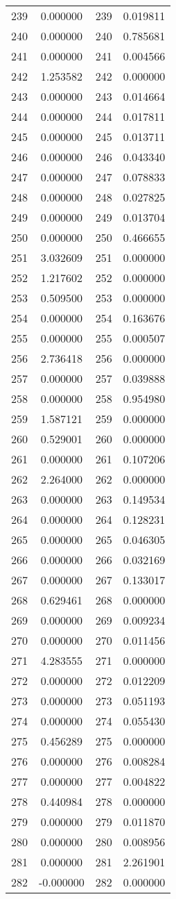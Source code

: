\documentclass[12pt]{article}
\begin{document}
\begin{longtable}{@{}cccc@{}}
239 & 0.000000 & 239 & 0.019811 \\
240 & 0.000000 & 240 & 0.785681 \\
241 & 0.000000 & 241 & 0.004566 \\
242 & 1.253582 & 242 & 0.000000 \\
243 & 0.000000 & 243 & 0.014664 \\
244 & 0.000000 & 244 & 0.017811 \\
245 & 0.000000 & 245 & 0.013711 \\
246 & 0.000000 & 246 & 0.043340 \\
247 & 0.000000 & 247 & 0.078833 \\
248 & 0.000000 & 248 & 0.027825 \\
249 & 0.000000 & 249 & 0.013704 \\
250 & 0.000000 & 250 & 0.466655 \\
251 & 3.032609 & 251 & 0.000000 \\
252 & 1.217602 & 252 & 0.000000 \\
253 & 0.509500 & 253 & 0.000000 \\
254 & 0.000000 & 254 & 0.163676 \\
255 & 0.000000 & 255 & 0.000507 \\
256 & 2.736418 & 256 & 0.000000 \\
257 & 0.000000 & 257 & 0.039888 \\
258 & 0.000000 & 258 & 0.954980 \\
259 & 1.587121 & 259 & 0.000000 \\
260 & 0.529001 & 260 & 0.000000 \\
261 & 0.000000 & 261 & 0.107206 \\
262 & 2.264000 & 262 & 0.000000 \\
263 & 0.000000 & 263 & 0.149534 \\
264 & 0.000000 & 264 & 0.128231 \\
265 & 0.000000 & 265 & 0.046305 \\
266 & 0.000000 & 266 & 0.032169 \\
267 & 0.000000 & 267 & 0.133017 \\
268 & 0.629461 & 268 & 0.000000 \\
269 & 0.000000 & 269 & 0.009234 \\
270 & 0.000000 & 270 & 0.011456 \\
271 & 4.283555 & 271 & 0.000000 \\
272 & 0.000000 & 272 & 0.012209 \\
273 & 0.000000 & 273 & 0.051193 \\
274 & 0.000000 & 274 & 0.055430 \\
275 & 0.456289 & 275 & 0.000000 \\
276 & 0.000000 & 276 & 0.008284 \\
277 & 0.000000 & 277 & 0.004822 \\
278 & 0.440984 & 278 & 0.000000 \\
279 & 0.000000 & 279 & 0.011870 \\
280 & 0.000000 & 280 & 0.008956 \\
281 & 0.000000 & 281 & 2.261901 \\
282 & -0.000000 & 282 & 0.000000 \\


\end{longtable}
\end{document}

